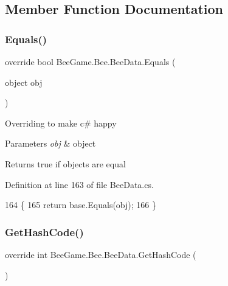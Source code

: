 \subsection{Member Function Documentation}
\mbox{\label{struct_bee_game_1_1_bee_1_1_bee_data_a5909cd9eb6bbe6f7f2ef348e135b6c86}} 
\subsubsection{\texorpdfstring{Equals()}{Equals()}}
{\footnotesize\ttfamily override bool Bee\+Game.\+Bee.\+Bee\+Data.\+Equals (\begin{DoxyParamCaption}\item[{object}]{obj }\end{DoxyParamCaption})}



Overriding to make c\# happy 


\begin{DoxyParams}{Parameters}
{\em obj} & object\\
\hline
\end{DoxyParams}
\begin{DoxyReturn}{Returns}
true if objects are equal
\end{DoxyReturn}


Definition at line 163 of file Bee\+Data.\+cs.


\begin{DoxyCode}
164         \{
165             \textcolor{keywordflow}{return} base.Equals(obj);
166         \}
\end{DoxyCode}
\mbox{\label{struct_bee_game_1_1_bee_1_1_bee_data_ab11b7e2d244cb0021c52ae0b839ff6c3}} 
\subsubsection{\texorpdfstring{Get\+Hash\+Code()}{GetHashCode()}}
{\footnotesize\ttfamily override int Bee\+Game.\+Bee.\+Bee\+Data.\+Get\+Hash\+Code (\begin{DoxyParamCaption}{ }\end{DoxyParamCaption})}



